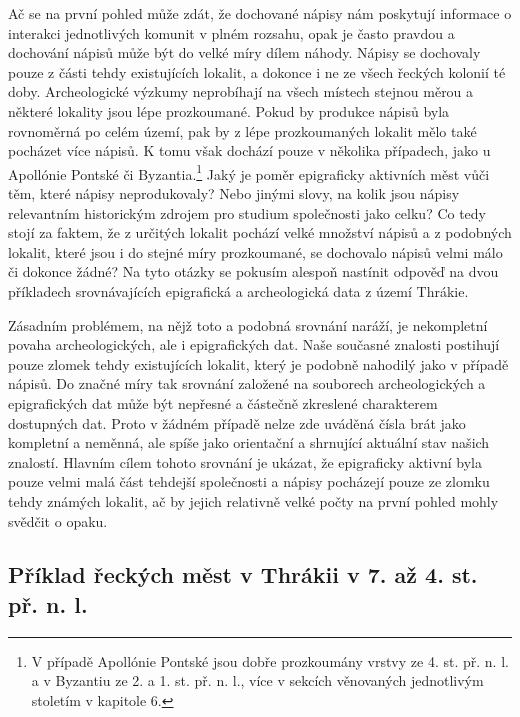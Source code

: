 Ač se na první pohled může zdát, že dochované nápisy nám poskytují informace o interakci jednotlivých komunit v plném rozsahu, opak je často pravdou a dochování nápisů může být do velké míry dílem náhody. Nápisy se dochovaly pouze z části tehdy existujících lokalit, a dokonce i ne ze všech řeckých kolonií té doby. Archeologické výzkumy neprobíhají na všech místech stejnou měrou a některé lokality jsou lépe prozkoumané. Pokud by produkce nápisů byla rovnoměrná po celém území, pak by z lépe prozkoumaných lokalit mělo také pocházet více nápisů. K tomu však dochází pouze v několika případech, jako u Apollónie Pontské či Byzantia.\footnote{V případě Apollónie Pontské jsou dobře prozkoumány vrstvy ze 4. st. př. n. l. a v Byzantiu ze 2. a 1. st. př. n. l., více v sekcích věnovaných jednotlivým stoletím v kapitole 6.} Jaký je poměr epigraficky aktivních měst vůči těm, které nápisy neprodukovaly? Nebo jinými slovy, na kolik jsou nápisy relevantním historickým zdrojem pro studium společnosti jako celku? Co tedy stojí za faktem, že z určitých lokalit pochází velké množství nápisů a z podobných lokalit, které jsou i do stejné míry prozkoumané, se dochovalo nápisů velmi málo či dokonce žádné? Na tyto otázky se pokusím alespoň nastínit odpověď na dvou příkladech srovnávajících epigrafická a archeologická data z území Thrákie.

Zásadním problémem, na nějž toto a podobná srovnání naráží, je nekompletní povaha archeologických, ale i epigrafických dat. Naše současné znalosti postihují pouze zlomek tehdy existujících lokalit, který je podobně nahodilý jako v případě nápisů. Do značné míry tak srovnání založené na souborech archeologických a epigrafických dat může být nepřesné a částečně zkreslené charakterem dostupných dat. Proto v žádném případě nelze zde uváděná čísla brát jako kompletní a neměnná, ale spíše jako orientační a shrnující aktuální stav našich znalostí. Hlavním cílem tohoto srovnání je ukázat, že epigraficky aktivní byla pouze velmi malá část tehdejší společnosti a nápisy pocházejí pouze ze zlomku tehdy známých lokalit, ač by jejich relativně velké počty na první pohled mohly svědčit o opaku.

\subsection[příklad-řeckých-měst-v-thrákii-v-7.-až-4.-st.-př.-n.-l.]{Příklad řeckých měst v Thrákii v 7. až 4. st. př. n. l.}

